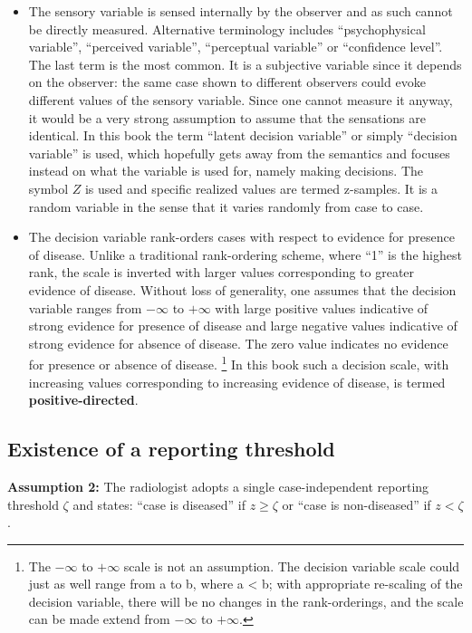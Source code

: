 \documentclass[
]{book}
\begin{document}
\begin{itemize}
\item
  The sensory variable is sensed internally by the observer and as such cannot be directly measured. Alternative terminology includes ``psychophysical variable'', ``perceived variable'', ``perceptual variable'' or ``confidence level''. The last term is the most common. It is a subjective variable since it depends on the observer: the same case shown to different observers could evoke different values of the sensory variable. Since one cannot measure it anyway, it would be a very strong assumption to assume that the sensations are identical. In this book the term ``latent decision variable'' or simply ``decision variable'' is used, which hopefully gets away from the semantics and focuses instead on what the variable is used for, namely making decisions. The symbol \(Z\) is used and specific realized values are termed z-samples. It is a random variable in the sense that it varies randomly from case to case.
\item
  The decision variable rank-orders cases with respect to evidence for presence of disease. Unlike a traditional rank-ordering scheme, where ``1'' is the highest rank, the scale is inverted with larger values corresponding to greater evidence of disease. Without loss of generality, one assumes that the decision variable ranges from \(-\infty\) to \(+\infty\) with large positive values indicative of strong evidence for presence of disease and large negative values indicative of strong evidence for absence of disease. The zero value indicates no evidence for presence or absence of disease. \footnote{The \(-\infty\) to \(+\infty\) scale is not an assumption. The decision variable scale could just as well range from a to b, where a \textless{} b; with appropriate re-scaling of the decision variable, there will be no changes in the rank-orderings, and the scale can be made extend from \(-\infty\) to \(+\infty\).} In this book such a decision scale, with increasing values corresponding to increasing evidence of disease, is termed \textbf{positive-directed}.
\end{itemize}

\hypertarget{existence-of-a-reporting-threshold}{%
\subsection{Existence of a reporting threshold}\label{existence-of-a-reporting-threshold}}

\textbf{Assumption 2:} The radiologist adopts a single case-independent reporting threshold \(\zeta\) and states: ``case is diseased'' if \(z \ge \zeta\) or ``case is non-diseased'' if \(z < \zeta\).
\end{document}
